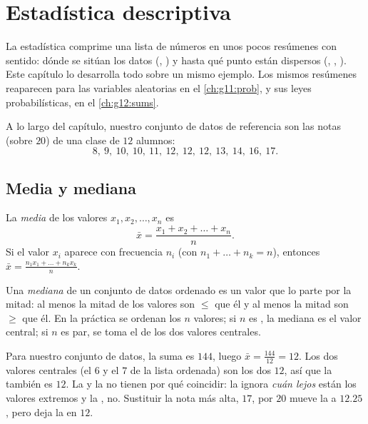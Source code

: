 \chapter{Estadística descriptiva}\label{ch:g11:stat}

La estadística comprime una lista de números en unos pocos resúmenes con
sentido: dónde se sitúan los datos (, ) y hasta qué punto están
dispersos (, , ). Este capítulo lo
desarrolla todo sobre un mismo ejemplo. Los mismos resúmenes reaparecen
para las variables aleatorias en el \cref{ch:g11:prob}, y sus leyes
probabilísticas, en el \cref{ch:g12:sums}.

A lo largo del capítulo, nuestro conjunto de datos de referencia son las
notas (sobre $20$) de una clase de $12$ alumnos:
\[
8,\ 9,\ 10,\ 10,\ 11,\ 12,\ 12,\ 12,\ 13,\ 14,\ 16,\ 17 .
\]

\section{Media y mediana}

\begin{definition}[Media]\label{def:g11:stat:mean}
La \emph{media} de los valores $x_1, x_2, \dots, x_n$ es
\[
\bar x = \frac{x_1 + x_2 + \dots + x_n}{n}.
\]
Si el valor $x_i$ aparece con frecuencia $n_i$ (con
$n_1 + \dots + n_k = n$), entonces
$\bar x = \frac{n_1 x_1 + \dots + n_k x_k}{n}$.
\end{definition}

\begin{definition}[Mediana]\label{def:g11:stat:median}
Una \emph{mediana} de un conjunto de datos ordenado es un
valor que lo parte por la mitad: al menos la mitad de los valores son
$\leq$ que él y al menos la mitad son $\geq$ que él. En la práctica se
ordenan los $n$ valores; si $n$ es , la mediana es el valor central;
si $n$ es par, se toma el  de los dos valores centrales.
\end{definition}

\begin{example}\label{ex:g11:stat:meanmedian}
Para nuestro conjunto de datos, la suma es $144$, luego
$\bar x = \frac{144}{12} = 12$. Los dos valores centrales (el $6$ y el $7$
de la lista ordenada) son los dos $12$, así que la  también es
$12$. La  y la  no tienen por qué coincidir: la 
ignora \emph{cuán lejos} están los valores extremos y la , no.
Sustituir la nota más alta, $17$, por $20$ mueve la  a $12.25$, pero
deja la  en $12$.
\end{example}

